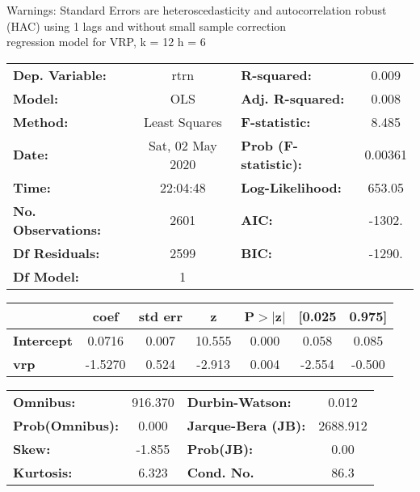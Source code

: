 Warnings: \newline
 [1] Standard Errors are heteroscedasticity and autocorrelation robust (HAC) using 1 lags and without small sample correction\\ 

regression model for VRP, k = 12 h = 6\begin{center}
\begin{tabular}{lclc}
\toprule
\textbf{Dep. Variable:}    &       rtrn       & \textbf{  R-squared:         } &     0.009   \\
\textbf{Model:}            &       OLS        & \textbf{  Adj. R-squared:    } &     0.008   \\
\textbf{Method:}           &  Least Squares   & \textbf{  F-statistic:       } &     8.485   \\
\textbf{Date:}             & Sat, 02 May 2020 & \textbf{  Prob (F-statistic):} &  0.00361    \\
\textbf{Time:}             &     22:04:48     & \textbf{  Log-Likelihood:    } &    653.05   \\
\textbf{No. Observations:} &        2601      & \textbf{  AIC:               } &    -1302.   \\
\textbf{Df Residuals:}     &        2599      & \textbf{  BIC:               } &    -1290.   \\
\textbf{Df Model:}         &           1      & \textbf{                     } &             \\
\bottomrule
\end{tabular}
\begin{tabular}{lcccccc}
                   & \textbf{coef} & \textbf{std err} & \textbf{z} & \textbf{P$> |$z$|$} & \textbf{[0.025} & \textbf{0.975]}  \\
\midrule
\textbf{Intercept} &       0.0716  &        0.007     &    10.555  &         0.000        &        0.058    &        0.085     \\
\textbf{vrp}       &      -1.5270  &        0.524     &    -2.913  &         0.004        &       -2.554    &       -0.500     \\
\bottomrule
\end{tabular}
\begin{tabular}{lclc}
\textbf{Omnibus:}       & 916.370 & \textbf{  Durbin-Watson:     } &    0.012  \\
\textbf{Prob(Omnibus):} &   0.000 & \textbf{  Jarque-Bera (JB):  } & 2688.912  \\
\textbf{Skew:}          &  -1.855 & \textbf{  Prob(JB):          } &     0.00  \\
\textbf{Kurtosis:}      &   6.323 & \textbf{  Cond. No.          } &     86.3  \\
\bottomrule
\end{tabular}
\end{center}

